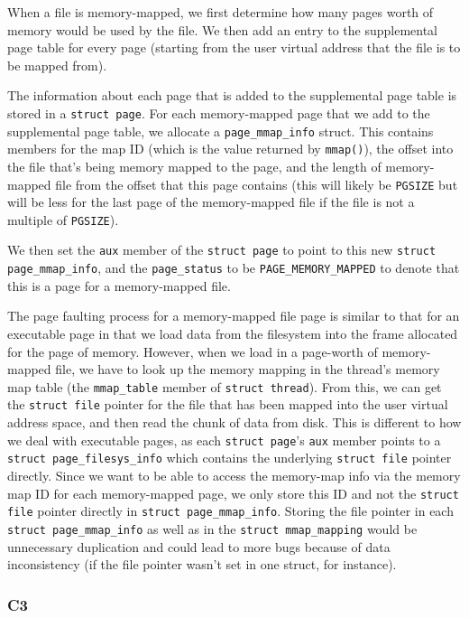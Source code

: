 \documentclass[a4wide, 11pt]{article}
\newcommand{\tx}{\texttt}
\begin{document}
When a file is memory-mapped, we first determine how many pages worth of memory would be used by the file. We then add an entry to the supplemental page table for every page (starting from the user virtual address that the file is to be mapped from).

The information about each page that is added to the supplemental page table is stored in a \tx{struct page}. For each memory-mapped page that we add to the supplemental page table, we allocate a \tx{page\_mmap\_info} struct. This contains members for the map ID (which is the value returned by \tx{mmap()}), the offset into the file that's being memory mapped to the page, and the length of memory-mapped file from the offset that this page contains (this will likely be \tx{PGSIZE} but will be less for the last page of the memory-mapped file if the file is not a multiple of \tx{PGSIZE}).

We then set the \tx{aux} member of the \tx{struct page} to point to this new \tx{struct page\_mmap\_info}, and the \tx{page\_status} to be \tx{PAGE\_MEMORY\_MAPPED} to denote that this is a page for a memory-mapped file.

The page faulting process for a memory-mapped file page is similar to that for an executable page in that we load data from the filesystem into the frame allocated for the page of memory. However, when we load in a page-worth of memory-mapped file, we have to look up the memory mapping in the thread's memory map table (the \tx{mmap\_table} member of \tx{struct thread}). From this, we can get the \tx{struct file} pointer for the file that has been mapped into the user virtual address space, and then read the chunk of data from disk. This is different to how we deal with executable pages, as each \tx{struct page}'s \tx{aux} member points to a \tx{struct page\_filesys\_info} which contains the underlying \tx{struct file} pointer directly. Since we want to be able to access the memory-map info via the memory map ID for each memory-mapped page, we only store this ID and not the \tx{struct file} pointer directly in \tx{struct page\_mmap\_info}. Storing the file pointer in each \tx{struct page\_mmap\_info} as well as in the \tx{struct mmap\_mapping} would be unnecessary duplication and could lead to more bugs because of data inconsistency (if the file pointer wasn't set in one struct, for instance).

\subsubsection{C3}
\end{document}
